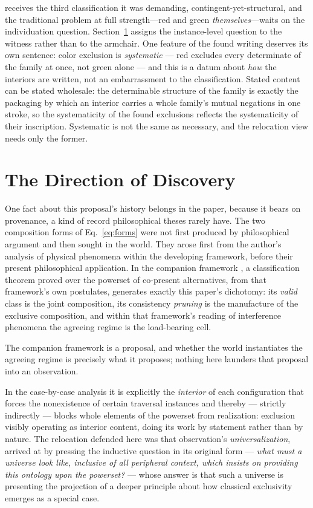 \documentclass[11pt]{article}
\begin{document}
receives the third classification it was demanding, contingent-yet-structural, and the traditional problem at full strength---red and green \emph{themselves}---waits on the individuation question. Section~\ref{sec:exposure} assigns the instance-level question to the witness rather than to the armchair. One feature of the found writing deserves its own sentence: color exclusion is \emph{systematic} --- red excludes every determinate of the family at once, not green alone --- and this is a datum about \emph{how} the interiors are written, not an embarrassment to the classification. Stated content can be stated wholesale: the determinable structure of the family \parencite{wilson2013} is exactly the packaging by which an interior carries a whole family's mutual negations in one stroke, so the systematicity of the found exclusions reflects the systematicity of their inscription. Systematic is not the same as necessary, and the relocation view needs only the former.

\section{The Direction of Discovery}\label{sec:exposure}
One fact about this proposal's history belongs in the paper, because it bears on provenance, a kind of record philosophical theses rarely have. The two composition forms of Eq.~\eqref{eq:forms} were not first produced by philosophical argument and then sought in the world. They arose first from the author's analysis of physical phenomena within the developing framework, before their present philosophical application. In the companion framework \parencite{Aethus, AethusBrief}, a classification theorem proved over the powerset of co-present alternatives, from that framework's own postulates, generates exactly this paper's dichotomy: its \emph{valid} class is the joint composition, its consistency \emph{pruning} is the manufacture of the exclusive composition, and within that framework's reading of interference phenomena the agreeing regime is the load-bearing cell.

 The companion framework is a proposal, and whether the world instantiates the agreeing regime is precisely what it proposes; nothing here launders that proposal into an observation.

 In the case-by-case analysis it is explicitly the \emph{interior} of each configuration that forces the nonexistence of certain traversal instances and thereby --- strictly indirectly --- blocks whole elements of the powerset from realization: exclusion visibly operating as interior content, doing its work by statement rather than by nature. The relocation defended here was that observation's \emph{universalization}, arrived at by pressing the inductive question in its original form --- \emph{what must a universe look like, inclusive of all peripheral context, which insists on providing this ontology upon the powerset?} --- whose answer is that such a universe is presenting the projection of a deeper principle about how classical exclusivity emerges as a special case.
\end{document}
